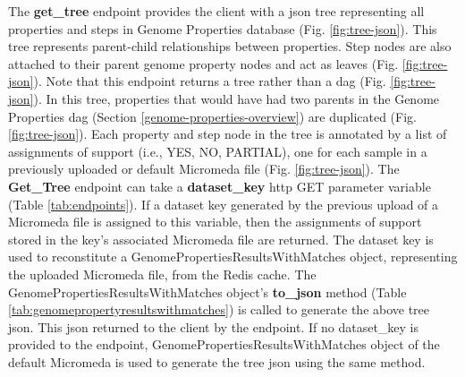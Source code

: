 The \textbf{get\_tree} endpoint provides the client with a \gls{json} tree representing all properties and steps in Genome Properties database (Fig. \ref{fig:tree-json}). This tree represents parent-child relationships between properties. Step nodes are also attached to their parent genome property nodes and act as leaves (Fig. \ref{fig:tree-json}). Note that this endpoint returns a tree rather than a \gls{dag} (Fig. \ref{fig:tree-json}). In this tree, properties that would have had two parents in the Genome Properties \gls{dag} (Section \ref{genome-properties-overview}) are duplicated (Fig. \ref{fig:tree-json}). Each property and step node in the tree is annotated by a list of assignments of support (i.e., YES, NO, PARTIAL), one for each sample in a previously uploaded or default Micromeda file (Fig. \ref{fig:tree-json}). The \textbf{Get\_Tree} endpoint can take a \textbf{dataset\_key} \gls{http} GET parameter variable (Table \ref{tab:endpoints}). If a dataset key generated by the previous upload of a Micromeda file is assigned to this variable, then the assignments of support stored in the key's associated Micromeda file are returned. The dataset key is used to reconstitute a GenomePropertiesResultsWithMatches object, representing the uploaded Micromeda file, from the Redis cache. The GenomePropertiesResultsWithMatches object's \textbf{to\_json} method (Table \ref{tab:genomepropertyresultswithmatches}) is called to generate the above tree \gls{json}. This \gls{json} returned to the client by the endpoint. If no dataset\_key is provided to the endpoint, GenomePropertiesResultsWithMatches object of the default Micromeda is used to generate the tree \gls{json} using the same method.

